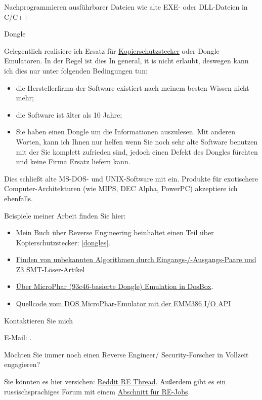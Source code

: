 \large Nachprogrammieren ausführbarer Dateien wie alte EXE- oder DLL-Dateien in C/C++ \normalsize

\large Dongle \normalsize

Gelegentlich realisiere ich Ersatz für
\href{https://en.wikipedia.org/wiki/Software_protection_dongle}{Kopierschutzstecker} oder Dongle Emulatoren.
In der Regel ist dies 
In general, it is nicht erlaubt, deswegen kann ich dies nur unter folgenden Bedingungen tun:

\begin{itemize}
\item die Herstellerfirma der Software existiert nach meinem besten Wissen nicht mehr;
\item die Software ist älter als 10 Jahre;
\item Sie haben einen Dongle um die Informationen auszulesen. Mit anderen Worten, kann ich Ihnen
nur helfen wenn Sie noch sehr alte Software benutzen mit der Sie komplett zufrieden sind, jedoch
einen Defekt des Dongles fürchten und keine Firma Ersatz liefern kann. 
\end{itemize}

Dies schließt alte MS-DOS- und UNIX-Software mit ein. Produkte für exotischere Computer-Architekturen
(wie MIPS, DEC Alpha, PowerPC) akzeptiere ich ebenfalls.

Beispiele meiner Arbeit finden Sie hier:

\begin{itemize}
\item Mein Buch über Reverse Engineering beinhaltet einen Teil über Kopierschutzstecker: \ref{dongles}.
\item \href{http://yurichev.com/writings/z3_rockey.pdf}{Finden von unbekannten Algorithmen durch Eingangs-/-Ausgangs-Paare
und Z3 SMT-Löser-Artikel}
\item \href{http://yurichev.com/blog/56/}{Über MicroPhar (93c46-basierte Dongle) Emulation in DosBox}.
\item \href{http://conus.info/dongle/src/microph.asm}{Quellcode vom DOS MicroPhar-Emulator mit der EMM386 I/O API}
\end{itemize}

\large Kontaktieren Sie mich \normalsize

E-Mail: \GTT{\EMAIL}.

\large Möchten Sie immer noch einen Reverse Engineer/ Security-Forscher in Vollzeit engagieren? \normalsize

Sie könnten es hier versichen: \href{https://www.reddit.com/r/ReverseEngineering/comments/49cza0/rreverseengineerings_2015_triannual_hiring_thread/}{Reddit RE Thread}.
Außerdem gibt es ein russischsprachiges Forum mit einem \href{https://forum.reverse4you.org/forumdisplay.php?f=252}{Abschnitt für RE-Jobs}.

\fi %

\vspace*{\fill}
\vfill
